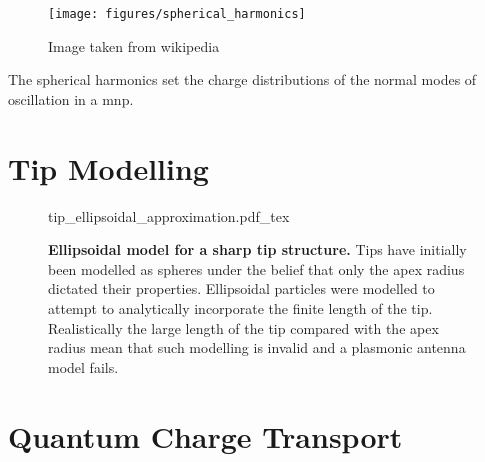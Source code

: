 \documentclass[a4paper]{article}
\begin{document}
\begin{figure}[h]
\centering
\texttt{[image: figures/spherical\_harmonics]}
\caption*{Image taken from wikipedia}
\label{fig:spherical_harmonics}
\end{figure}

The spherical harmonics set the charge distributions of the normal modes of oscillation in a \gls{mnp}.




\section{Tip Modelling}

\begin{figure}[bt]
{tip_ellipsoidal_approximation.pdf_tex}
\caption*{\textbf{Ellipsoidal model for a sharp tip structure.} Tips have initially been modelled as spheres under the belief that only the apex radius dictated their properties. Ellipsoidal particles were modelled to attempt to analytically incorporate the finite length of the tip. Realistically the large length of the tip compared with the apex radius mean that such modelling is invalid and a plasmonic antenna model fails.}
\label{fig:tip_ellipsoidal_approximation}
\end{figure}

\section{Quantum Charge Transport}
\end{document}
